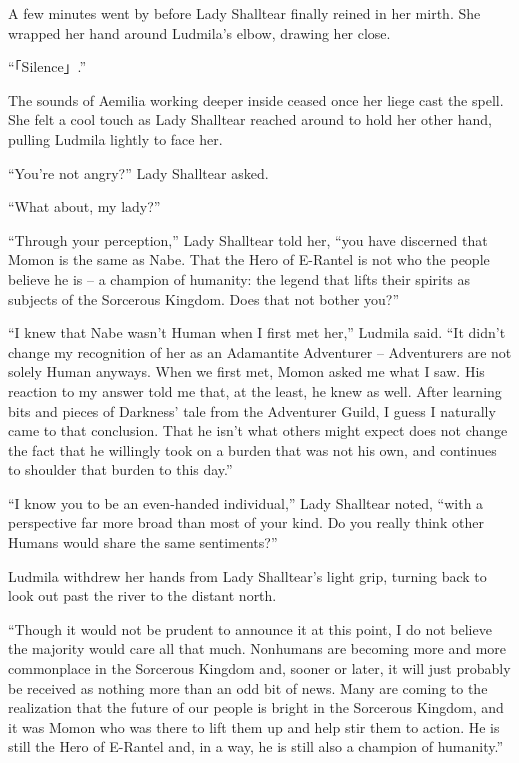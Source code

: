 A few minutes went by before Lady Shalltear finally reined in her mirth. She wrapped her hand around Ludmila’s elbow, drawing her close.

 

“「Silence」.”

 

The sounds of Aemilia working deeper inside ceased once her liege cast the spell. She felt a cool touch as Lady Shalltear reached around to hold her other hand, pulling Ludmila lightly to face her.

 

“You’re not angry?” Lady Shalltear asked.

 

“What about, my lady?”

 

“Through your perception,” Lady Shalltear told her, “you have discerned that Momon is the same as Nabe. That the Hero of E-Rantel is not who the people believe he is – a champion of humanity: the legend that lifts their spirits as subjects of the Sorcerous Kingdom. Does that not bother you?”

 

“I knew that Nabe wasn’t Human when I first met her,” Ludmila said. “It didn’t change my recognition of her as an Adamantite Adventurer – Adventurers are not solely Human anyways. When we first met, Momon asked me what I saw. His reaction to my answer told me that, at the least, he knew as well. After learning bits and pieces of Darkness’ tale from the Adventurer Guild, I guess I naturally came to that conclusion. That he isn’t what others might expect does not change the fact that he willingly took on a burden that was not his own, and continues to shoulder that burden to this day.”

 

“I know you to be an even-handed individual,” Lady Shalltear noted, “with a perspective far more broad than most of your kind. Do you really think other Humans would share the same sentiments?”

 

Ludmila withdrew her hands from Lady Shalltear’s light grip, turning back to look out past the river to the distant north.

 

“Though it would not be prudent to announce it at this point, I do not believe the majority would care all that much. Nonhumans are becoming more and more commonplace in the Sorcerous Kingdom and, sooner or later, it will just probably be received as nothing more than an odd bit of news. Many are coming to the realization that the future of our people is bright in the Sorcerous Kingdom, and it was Momon who was there to lift them up and help stir them to action. He is still the Hero of E-Rantel and, in a way, he is still also a champion of humanity.”

